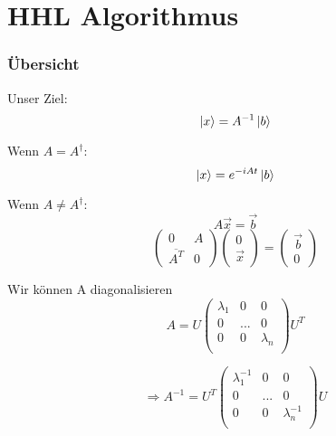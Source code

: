\section{HHL Algorithmus}


\begin{frame}
\frametitle{Übersicht}

Unser Ziel:
$$\ket{x} = A^{-1}\ket{b}$$

\hfil

Wenn $A=A^\dagger$: 
$$\ket{x} = e^{-iAt} \ket{b}$$


Wenn $A\neq A^\dagger$: 
    $$A \vec{x} = \vec{b}$$
    $$\begin{pmatrix} 0 & A \\ \overline {A^T} & 0 \end{pmatrix} 
    \begin{pmatrix} 0 \\ \vec{x}  \end{pmatrix}
    =
    \begin{pmatrix} \vec{b} \\ 0 \end{pmatrix} $$

Wir können A diagonalisieren 
    $$A = U \begin{pmatrix} \lambda_1 & 0 & 0\\ 0 & ... & 0\\ 0 & 0& \lambda_n \\ \end{pmatrix} U^T$$

    $$ \Rightarrow A^{-1}=  U^T 
    \begin{pmatrix} \lambda_1^{-1} & 0 & 0\\ 0 & ... & 0\\ 0 & 0& \lambda_n^{-1} \\ \end{pmatrix}
    U$$

\end{frame}



